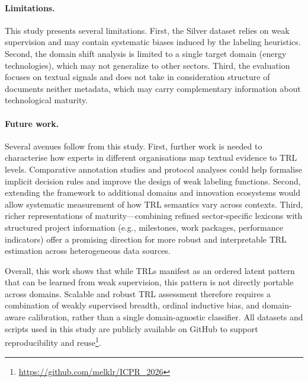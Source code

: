 \documentclass[runningheads]{llncs}
\begin{document}
\paragraph{Limitations.}
This study presents several limitations. First, the Silver dataset relies on weak supervision and may contain systematic biases induced by the labeling heuristics. Second, the domain shift analysis is limited to a single target domain (energy technologies), which may not generalize to other sectors. Third, the evaluation focuses on textual signals and does not take in consideration structure of documents neither metadata, which may carry complementary information about technological maturity.
\color{black}
\paragraph{Future work.}
Several avenues follow from this study. First, further work is needed to characterise how experts in different organisations map textual evidence to TRL levels. Comparative annotation studies and protocol analyses could help formalise implicit decision rules and improve the design of weak labeling functions. Second, extending the framework to additional domains and innovation ecosystems would allow systematic measurement of how TRL semantics vary across contexts. Third, richer representations of maturity—combining refined sector-specific lexicons with structured project information (e.g., milestones, work packages, performance indicators) offer a promising direction for more robust and interpretable TRL estimation across heterogeneous data sources.

Overall, this work shows that while TRLs manifest as an ordered latent pattern that can be learned from weak supervision, this pattern is not directly portable across domains. Scalable and robust TRL assessment therefore requires a combination of weakly supervised breadth, ordinal inductive bias, and domain-aware calibration, rather than a single domain-agnostic classifier.
All datasets and scripts used in this study are publicly available on GitHub to support reproducibility and reuse\footnote{\url{https://github.com/melklr/ICPR\_2026}}.




%
%
%


%
\end{document}
